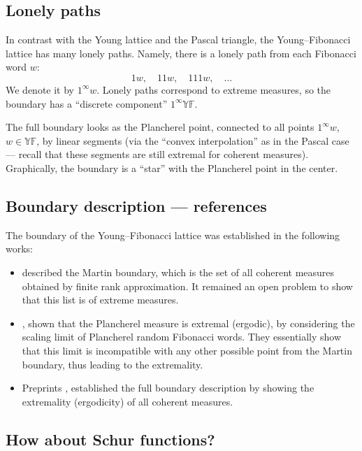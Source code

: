 \documentclass[letterpaper,11pt,oneside,reqno]{article}
\numberwithin{equation}{section}
\theoremstyle{definition}
\begin{document}
\subsection{Lonely paths}

In contrast with the Young lattice and the Pascal triangle,
the Young--Fibonacci lattice has many lonely paths.
Namely, there is a lonely path from each Fibonacci word $w$:
\begin{equation*}
	1w, \quad 11w, \quad 111w, \quad \ldots
\end{equation*}
We denote it by $1^\infty w$.
Lonely paths correspond to extreme measures,
so the boundary has a ``discrete component''
$1^\infty\mathbb{YF}$.

The full boundary looks as the Plancherel point,
connected to all points $1^\infty w$, $w\in\mathbb{YF}$,
by linear segments (via the ``convex interpolation'' as in the
Pascal case --- recall that these segments are still extremal
for coherent measures).
Graphically, the boundary is a ``star'' with the Plancherel point
in the center.

\subsection{Boundary description --- references}

The boundary of the Young--Fibonacci lattice
was established in the following works:
\begin{itemize}
	\item \cite{KerovGoodman1997} described the Martin
		boundary, which is the set of all coherent measures
		obtained by finite rank approximation. It remained an
		open problem to show that this list is of extreme measures.
	\item \cite{gnedin2000plancherel}, shown that the Plancherel measure is extremal
		(ergodic), by considering the scaling limit of
		Plancherel random Fibonacci words. They essentially show that this limit is incompatible
		with any other possible point from the Martin boundary, thus
		leading to the extremality.
	\item Preprints
		\cite{BochkovEvtushevsky2020},
		\cite{Evtushevsky2020PartII}
		established the full boundary description by showing
		the extremality (ergodicity) of all coherent measures.
\end{itemize}

\subsection{How about Schur functions?}
\end{document}
